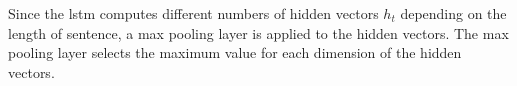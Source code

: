 Since the \ac{lstm} computes different numbers of hidden vectors $h_t$ depending on the length of sentence, a max pooling layer is applied to the hidden vectors.
The max pooling layer selects the maximum value for each dimension of the hidden vectors.






